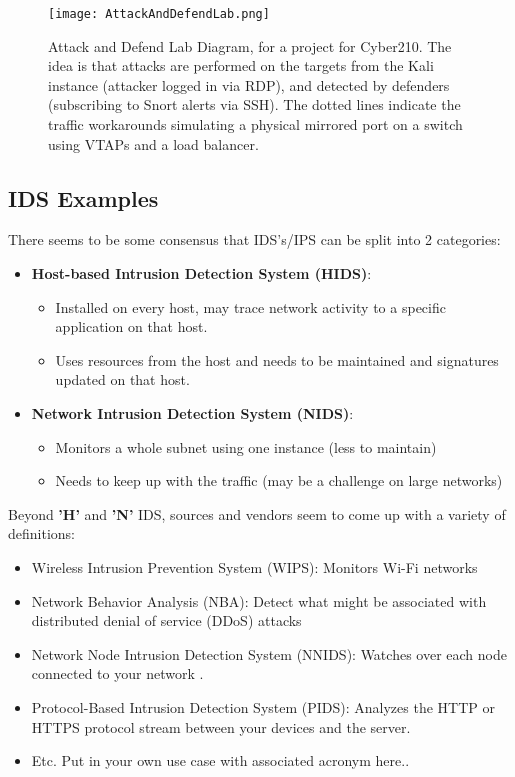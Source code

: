 \documentclass[
	letterpaper, %
	10pt, %
	unnumberedsections, %
	twoside, %
]{APAAssignment}
\begin{document}
\begin{figure}[!htp] %
	\centering
	\texttt{[image: AttackAndDefendLab.png]}
	\caption{Attack and Defend Lab Diagram, for a project for Cyber210. The idea is that attacks are performed on the targets from the Kali instance (attacker logged in via RDP), and detected by defenders (subscribing to Snort alerts via SSH). The dotted lines indicate the traffic workarounds simulating a physical mirrored port on a switch using VTAPs and a load balancer.}
	\label{fig:AttackAndDefendLab}
\end{figure}

\subsection{IDS Examples}


There seems to be  some consensus that IDS's/IPS can be split into 2 categories:

\begin{itemize}
	\item \textbf{Host-based Intrusion Detection System (HIDS)}: 
	\begin{itemize}
		\item Installed on every host, may trace network activity to a specific application on that host.
		\item Uses resources from the host and needs to be maintained and signatures updated on that host.
	\end{itemize}
	\item \textbf{Network Intrusion Detection System (NIDS)}: 
	\begin{itemize}
		\item Monitors a whole subnet using one instance (less to maintain) 
		\item Needs to keep up with the traffic (may be a challenge on large networks)
	\end{itemize}
\end{itemize}

Beyond \textbf{'H'} and \textbf{'N'} IDS, sources and vendors seem to come up with a variety of definitions:

\begin{itemize}
	\item Wireless Intrusion Prevention System (WIPS):   Monitors Wi-Fi networks \cite{FortinetIPSdefinitiopns}
	\item Network Behavior Analysis (NBA): Detect what might be associated with distributed denial of service (DDoS) attacks \cite{FortinetIPSdefinitiopns}
	\item Network Node Intrusion Detection System (NNIDS): Watches over each node connected to your network \cite{HelixstormIDSdefinitiopns}.
	\item Protocol-Based Intrusion Detection System (PIDS): Analyzes the HTTP or HTTPS protocol stream between your devices and the server\cite{HelixstormIDSdefinitiopns}.
	\item Etc. Put in your own use case with associated acronym here..
\end{itemize}
\end{document}
